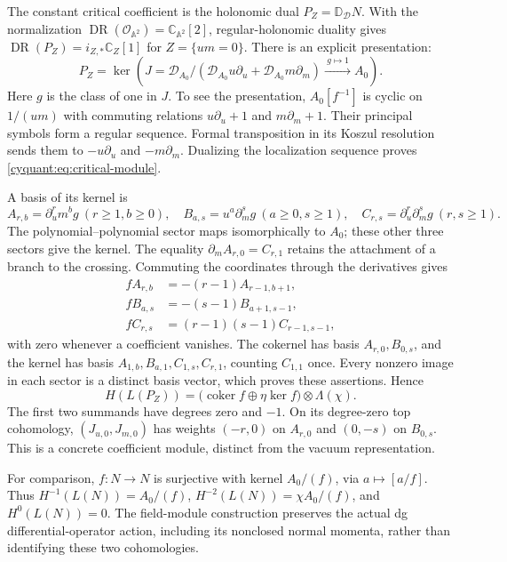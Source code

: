 The constant critical coefficient is the holonomic dual
$P_Z=\mathbb D_{\mathcal D}N$.  With the normalization
$\operatorname{DR}(\mathcal O_{\mathbb A^2})=\mathbb C_{\mathbb A^2}[2]$,
regular-holonomic duality gives
$\operatorname{DR}(P_Z)=i_{Z,*}\mathbb C_Z[1]$ for $Z=\{um=0\}$.
There is an explicit presentation:
\begin{equation}\label{cyquant:eq:critical-module}
 P_Z=\ker\left(
 J=\mathcal D_{A_0}/(\mathcal D_{A_0}u\partial_u+
                    \mathcal D_{A_0}m\partial_m)
       \xrightarrow{\ g\mapsto1\ }A_0\right).
\end{equation}
Here $g$ is the class of one in $J$.
To see the presentation, $A_0[f^{-1}]$ is cyclic on $1/(um)$ with commuting
relations $u\partial_u+1$ and $m\partial_m+1$.  Their principal
symbols form a regular sequence.  Formal transposition in its Koszul
resolution sends them to $-u\partial_u$ and $-m\partial_m$.
Dualizing the localization sequence proves
\eqref{cyquant:eq:critical-module}.

A basis of its kernel is
\[
 A_{r,b}=\partial_u^rm^bg\ (r\geq1,b\geq0),\quad
 B_{a,s}=u^a\partial_m^sg\ (a\geq0,s\geq1),\quad
 C_{r,s}=\partial_u^r\partial_m^sg\ (r,s\geq1).
\]
The polynomial--polynomial sector maps isomorphically to $A_0$;
these other three sectors give the kernel.  The equality
$\partial_mA_{r,0}=C_{r,1}$ retains the attachment of a branch to
the crossing.
Commuting the coordinates through the derivatives gives
\begin{equation}\label{cyquant:eq:critical-kernel}
 \begin{aligned}
 fA_{r,b}&=-(r-1)A_{r-1,b+1},\\
 fB_{a,s}&=-(s-1)B_{a+1,s-1},\\
 fC_{r,s}&=(r-1)(s-1)C_{r-1,s-1},
 \end{aligned}
\end{equation}
with zero whenever a coefficient vanishes.
The cokernel has basis $A_{r,0},B_{0,s}$, and the kernel has basis
$A_{1,b},B_{a,1},C_{1,s},C_{r,1}$, counting $C_{1,1}$ once.
Every nonzero image in each sector is a distinct basis vector, which
proves these assertions.  Hence
\[
 H(L(P_Z))=
  \bigl(\operatorname{coker}f\oplus\eta\operatorname{ker}f\bigr)
       \otimes\Lambda(\chi).
\]
The first two summands have degrees zero and $-1$.  On its degree-zero
top cohomology, $(J_{u,0},J_{m,0})$ has weights $(-r,0)$ on $A_{r,0}$
and $(0,-s)$ on $B_{0,s}$.  This is a concrete coefficient module,
distinct from the vacuum representation.

For comparison, $f:N\to N$ is surjective with kernel
$A_0/(f)$, via $a\mapsto[a/f]$.  Thus
$H^{-1}(L(N))=A_0/(f)$, $H^{-2}(L(N))=\chi A_0/(f)$, and
$H^0(L(N))=0$.  The field-module construction preserves the actual
dg differential-operator action, including its nonclosed normal
momenta, rather than identifying these two cohomologies.

